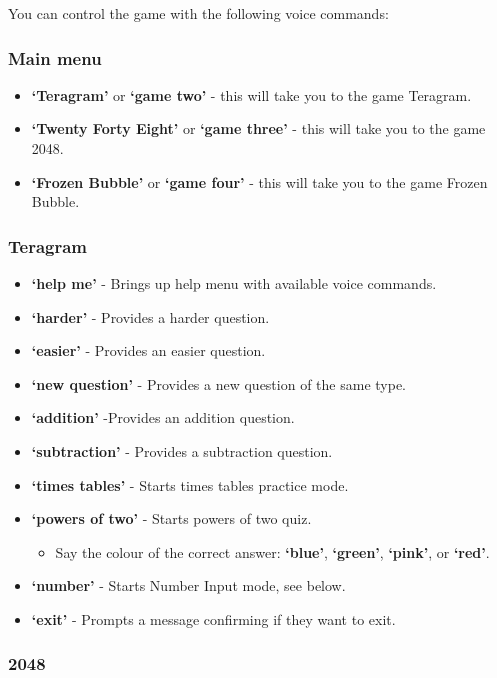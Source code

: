 \documentclass[11pt, oneside]{article}
\begin{document}
You can control the game with the following voice commands:

\subsubsection{Main menu}

\begin{itemize}
  \item {\bf`Teragram'} or {\bf`game two'}  - this will take you to the game Teragram.
  \item {\bf`Twenty Forty Eight'} or {\bf`game three'} - this will take you to the game 2048.
  \item {\bf`Frozen Bubble'} or {\bf`game four'} - this will take you to the game Frozen Bubble.
\end{itemize}

\subsubsection{Teragram}

\begin{itemize}
  \item {\bf`help me'} - Brings up help menu with available voice commands. 
  \item {\bf`harder'} - Provides a harder question. 
  \item {\bf`easier'} - Provides an easier question.
  \item {\bf`new question'} - Provides a new question of the same type.
  \item {\bf`addition'} -Provides an addition question.
  \item {\bf`subtraction'} - Provides a subtraction question.
  \item {\bf`times tables'} - Starts times tables practice mode.
  \item {\bf`powers of two'} - Starts powers of two quiz.
  \begin{itemize}
  	\item Say the colour of the correct answer: {\bf`blue'}, {\bf`green'}, {\bf`pink'}, or {\bf`red'}.
  \end{itemize}
  \item {\bf`number'} - Starts Number Input mode, see below.
  \item {\bf`exit'} - Prompts a message confirming if they want to exit.
 
\end{itemize}

\subsubsection{2048}
\end{document}
